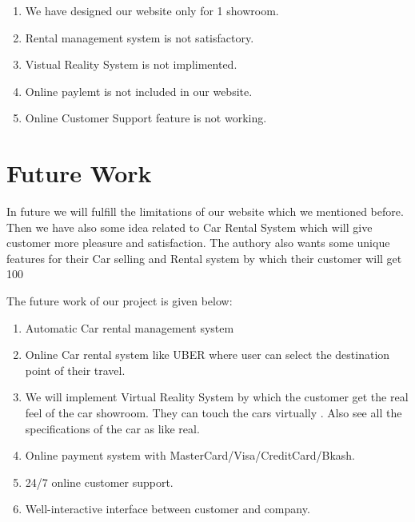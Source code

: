 \begin{enumerate}
\item  We have designed our website only for 1 showroom.

\item  Rental management system is not satisfactory.

\item  Vistual Reality System is not implimented.

\item  Online paylemt is not included in our website.

\item  Online Customer Support feature is not working.
\end{enumerate}

\noindent 

\noindent 
\section{ Future Work}

\noindent In future we will fulfill the limitations of our website which we mentioned before. Then we have also some idea related to Car Rental System which will give customer more pleasure and satisfaction. The authory also wants some unique features for their Car selling and Rental system by which their customer will get 100%

\noindent The future work of our project is given below:

\begin{enumerate}
\item  Automatic Car rental management system

\item  Online Car rental system like UBER where user can select the destination point of their travel.

\item  We will implement Virtual Reality System by which the customer get the real feel of the car showroom. They can touch the cars virtually . Also see all the specifications of the car as like real.

\item  Online payment system with MasterCard/Visa/CreditCard/Bkash.

\item  24/7 online customer support.

\item  Well-interactive interface between customer and company.

\end{enumerate}